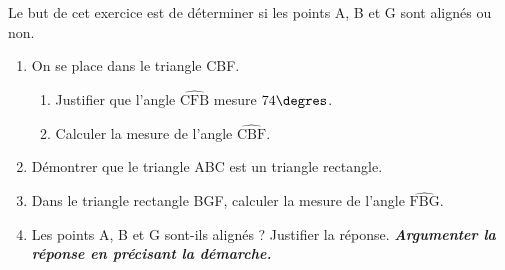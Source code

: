\medskip
Le but de cet exercice est de déterminer si les points A, B et G sont alignés ou non.

\begin{enumerate}
\item On se place dans le triangle CBF.
\begin{enumerate}[label=\textbf{\alph*.}]
\item Justifier que l'angle $\widehat{\text{CFB}}$ mesure $74\degres$.
\item Calculer la mesure de l'angle $\widehat{\text{CBF}}$.
\end{enumerate}
\item Démontrer que le triangle ABC est un triangle rectangle.
\item Dans le triangle rectangle BGF, calculer la mesure de l'angle $\widehat{\text{FBG}}$.
\item Les points A, B et G sont-ils alignés ? Justifier la réponse. \textbf{\textit{Argumenter la réponse en précisant la démarche.}}
\end{enumerate}
